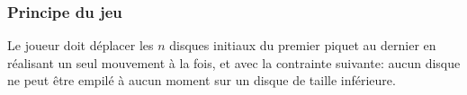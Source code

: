 \documentclass{beamer}%
\begin{document}
			\begin{frame}
				\frametitle{Principe du jeu}
				\begin{figure}
					\centering
					\qquad
				\end{figure}
				
				Le joueur doit déplacer les $n$ disques initiaux du premier piquet au dernier
				en réalisant un seul mouvement à la fois, et avec la contrainte suivante:
				aucun disque ne peut être empilé à aucun moment sur un disque de taille inférieure.				
			\end{frame}
		
\end{document}
